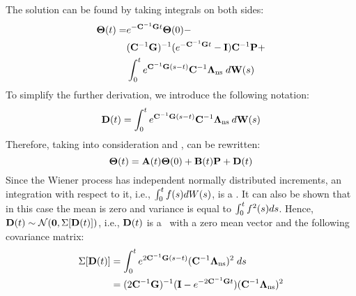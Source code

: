 The solution can be found by taking integrals on both sides:
\begin{align*}
  \mathbf{\Theta}(t) = & e^{-  \mathbf{C}^{-1} \mathbf{G} t} \mathbf{\Theta}(0) - \\
    & (\mathbf{C}^{-1} \mathbf{G})^{-1}(e^{-  \mathbf{C}^{-1} \mathbf{G} t} - \mathbf{I}) \mathbf{C}^{-1} \mathbf{P} + \\
    & \int_0^t e^{ \mathbf{C}^{-1} \mathbf{G} (s - t)} \mathbf{C}^{-1} \mathbf{\Lambda}_{\text{ns}} \; d\mathbf{W}(s)
\end{align*}
To simplify the further derivation, we introduce the following notation:
\begin{equation} \equlabel{d}
  \v{D}(\time) = \int_0^{\time} \ecg{}{(s - \time)} \mcapacitance^{-1} \ddev{\noisy} \: d\m{W}(s)
\end{equation}
Therefore, taking into consideration  and ,  can be rewritten:
\begin{equation} \equlabel{solution-full}
  \vtemp(\time) = \m{A}(\time) \vtemp(0) + \m{B}(\time) \vpower + \v{D}(\time)
\end{equation}
Since the Wiener process has independent normally distributed increments, an integration with respect to it, i.e., $\int_0^t f(s) dW(s)$, is a \nrv. It can also be shown that in this case the mean is zero and variance is equal to $\int_0^t f^2(s) ds$. Hence, $\mathbf{D}(t) \sim \mathcal{N}(\mathbf{0}, \Sigma[\mathbf{D}(t)])$, i.e., $\mathbf{D}(t)$ is a \mnrv\ with a zero mean vector and the following covariance matrix:
\begin{align}
  \cov{\v{D}(\time)} & = \int_0^\time \ecg{2}{(s - \time)} (\mcapacitance^{-1} \ddev{\noisy})^2 \; ds \nonumber \\
  & = (2 \cg)^{-1} (\mone - \emcgt{2}) (\mcapacitance^{-1} \ddev{\noisy})^2 \equlabel{covariance-d}
\end{align}
